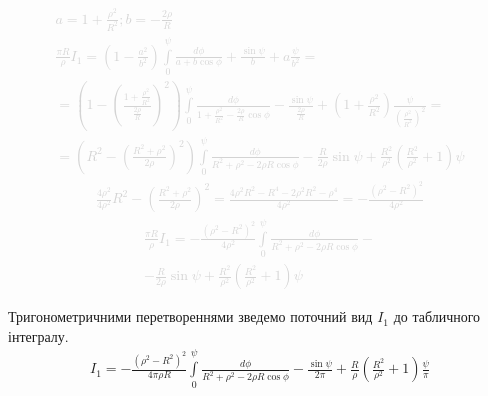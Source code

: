 %
\textcolor{lightgray}{ \begin{equation*} \begin{aligned}
a = 1 + \frac{\rho^2}{R^2}; b = - \frac{2 \rho}{ R } \\
\frac{\pi R}{\rho} I_1 = \left( 1 - \frac{a^2}{b^2} \right)
\int\limits_{0}^{\psi} \frac{d \phi}{a + b \cos \phi} +
\frac{\sin \psi}{b} + a \frac{\psi}{b^2} = \\
= \left( 1 - \left( \frac{1 + \frac{\rho^2}{R^2}} 
{ \frac{2 \rho}{R} } \right)^2 \right) 
\int \limits_{0}^{\psi} \frac{d \phi}{1 + \frac{\rho^2}{R^2} -  
\frac{2 \rho}{R} \cos \phi} -
\frac{\sin \psi}{\frac{2 \rho}{ R }} + \left( 1 + \frac{\rho^2}{R^2} \right) 
\frac{\psi}{\left( \frac{\rho^2}{R^2} \right)^2} = \\
= \left( R^2 - \left( \frac{R^2 + \rho^2} 
{2 \rho} \right)^2 \right) 
\int \limits_{0}^{\psi} \frac{d \phi}{R^2 + \rho^2 - 2 \rho R \cos \phi} -
\frac{R}{2 \rho} \sin \psi + \frac{R^2}{\rho^2} 
\left( \frac{R^2}{\rho^2} + 1 \right) \psi  
\end{aligned} \end{equation*} }
%
\textcolor{lightgray}{ \begin{equation*} \begin{aligned}
\frac{4 \rho^2}{4 \rho^2} R^2 - \left( \frac{R^2 + \rho^2}{2 \rho} \right)^2 =
\frac{4 \rho^2 R^2 - R^4 - 2 \rho^2 R^2 - \rho^4}{4 \rho^2} =
- \frac{\left( \rho^2 - R^2 \right)^2}{4 \rho^2} 
\end{aligned} \end{equation*} }
%
\textcolor{lightgray}{ \begin{equation*} \begin{aligned}
\frac{\pi R}{\rho} I_1 = 
- \frac{\left( \rho^2 - R^2 \right)^2}{4 \rho^2} 
\int \limits_{0}^{\psi} \frac{d \phi}{R^2 + \rho^2 - 2 \rho R \cos \phi} - \\
- \frac{R}{2 \rho} \sin \psi + \frac{R^2}{\rho^2} 
\left( \frac{R^2}{\rho^2} + 1 \right) \psi 
\end{aligned} \end{equation*} }

Тригонометричними перетвореннями зведемо поточний вид $ I_1 $ до табличного 
інтегралу.
%
\begin{equation*} \begin{aligned}
I_1 = - \frac{\left( \rho^2 - R^2 \right)^2}{4 \pi \rho R} 
\int \limits_{0}^{\psi} \frac{d \phi}{R^2 + \rho^2 - 2 \rho R \cos \phi} - 
\frac{\sin \psi}{2 \pi} + \frac{R}{\rho} 
\left( \frac{R^2}{\rho^2} + 1 \right) \frac{\psi}{\pi}
\end{aligned} \end{equation*}

